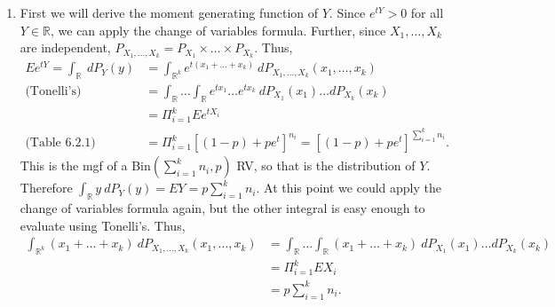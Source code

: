 \documentclass[12pt]{article}
\begin{document}
\begin{enumerate}[label=(\alph*)]
\item 
First we will derive the moment generating function of $Y$. Since $e^{tY} > 0$ for all $Y \in \mathbb{R}$, we can apply the change of variables
formula. Further, since $X_{1}, \hdots, X_{k}$ are independent, $P_{X_{1}, \hdots, X_{k}} = P_{X_{1}}\times \dots \times P_{X_{k}}$. Thus,
\begin{align*}
Ee^{tY} = \int_{\mathbb{R}}\ dP_{Y}(y) & = \int_{\mathbb{R}^{k}}e^{t(x_{1} + \dots + x_{k})}\ dP_{X_{1}, \hdots, X_{k}}(x_{1}, \hdots, x_{k}) \\
\text{(Tonelli's) } & = \int_{\mathbb{R}}\dots \int_{\mathbb{R}}e^{tx_{1}}\dots e^{tx_{k}}\ dP_{X_{1}}(x_{1})\dots dP_{X_{k}}(x_{k}) \\
& = \Pi_{i=1}^{k} Ee^{tX_{i}} \\
\text{(Table 6.2.1) } & = \Pi_{i=1}^{k} [(1-p) + pe^{t}]^{n_{i}} = [(1-p) + pe^{t}]^{\sum_{i=1}^{k}n_{i}}.
\end{align*}
This is the mgf of a Bin$(\sum_{i=1}^{k}n_{i}, p)$ RV, so that is the distribution of $Y$. Therefore $\int_{\mathbb{R}}y\ dP_{Y}(y) = EY =
p\sum_{i=1}^{k}n_{i}$. At this point we could apply the change of variables formula again, but the other integral is easy enough to evaluate 
using Tonelli's. Thus,
\begin{align*}
\int_{\mathbb{R}^{k}}(x_{1} + \dots + x_{k})\ dP_{X_{1},\hdots, X_{k}}(x_{1}, \hdots, x_{k}) & = \int_{\mathbb{R}}\dots \int_{\mathbb{R}} 
(x_{1} + \dots + x_{k})\ dP_{X_{1}}(x_{1})\dots dP_{X_{k}}(x_{k}) \\
& = \Pi_{i=1}^{k}EX_{i} \\
& = p\sum_{i=1}^{k}n_{i}.
\end{align*}

\end{enumerate}
\end{document}
